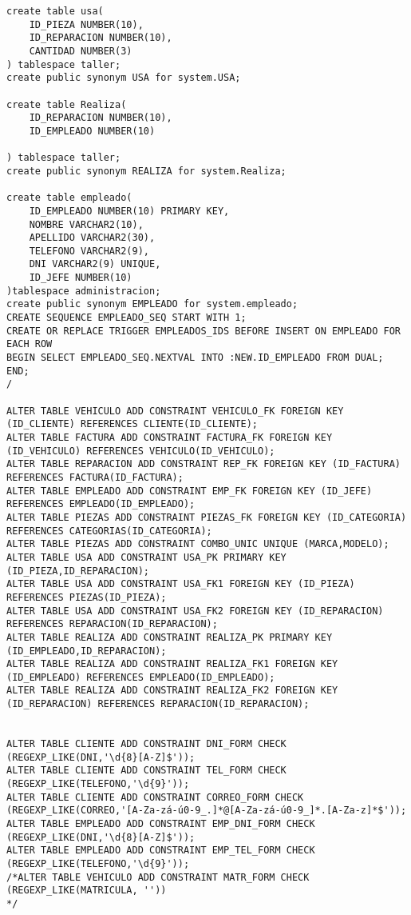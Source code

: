 \begin{lstlisting}[caption=Script .sql para crear la BD.]
create table usa(
    ID_PIEZA NUMBER(10),
    ID_REPARACION NUMBER(10),
    CANTIDAD NUMBER(3)
) tablespace taller;
create public synonym USA for system.USA;

create table Realiza(
    ID_REPARACION NUMBER(10),
    ID_EMPLEADO NUMBER(10)

) tablespace taller;
create public synonym REALIZA for system.Realiza;

create table empleado(
    ID_EMPLEADO NUMBER(10) PRIMARY KEY,
    NOMBRE VARCHAR2(10),
    APELLIDO VARCHAR2(30),
    TELEFONO VARCHAR2(9),
    DNI VARCHAR2(9) UNIQUE,
    ID_JEFE NUMBER(10)
)tablespace administracion;
create public synonym EMPLEADO for system.empleado;
CREATE SEQUENCE EMPLEADO_SEQ START WITH 1;
CREATE OR REPLACE TRIGGER EMPLEADOS_IDS BEFORE INSERT ON EMPLEADO FOR EACH ROW
BEGIN SELECT EMPLEADO_SEQ.NEXTVAL INTO :NEW.ID_EMPLEADO FROM DUAL;
END;
/

ALTER TABLE VEHICULO ADD CONSTRAINT VEHICULO_FK FOREIGN KEY (ID_CLIENTE) REFERENCES CLIENTE(ID_CLIENTE);
ALTER TABLE FACTURA ADD CONSTRAINT FACTURA_FK FOREIGN KEY (ID_VEHICULO) REFERENCES VEHICULO(ID_VEHICULO);
ALTER TABLE REPARACION ADD CONSTRAINT REP_FK FOREIGN KEY (ID_FACTURA) REFERENCES FACTURA(ID_FACTURA);
ALTER TABLE EMPLEADO ADD CONSTRAINT EMP_FK FOREIGN KEY (ID_JEFE) REFERENCES EMPLEADO(ID_EMPLEADO);
ALTER TABLE PIEZAS ADD CONSTRAINT PIEZAS_FK FOREIGN KEY (ID_CATEGORIA) REFERENCES CATEGORIAS(ID_CATEGORIA);
ALTER TABLE PIEZAS ADD CONSTRAINT COMBO_UNIC UNIQUE (MARCA,MODELO);
ALTER TABLE USA ADD CONSTRAINT USA_PK PRIMARY KEY (ID_PIEZA,ID_REPARACION);
ALTER TABLE USA ADD CONSTRAINT USA_FK1 FOREIGN KEY (ID_PIEZA) REFERENCES PIEZAS(ID_PIEZA);
ALTER TABLE USA ADD CONSTRAINT USA_FK2 FOREIGN KEY (ID_REPARACION) REFERENCES REPARACION(ID_REPARACION);
ALTER TABLE REALIZA ADD CONSTRAINT REALIZA_PK PRIMARY KEY (ID_EMPLEADO,ID_REPARACION);
ALTER TABLE REALIZA ADD CONSTRAINT REALIZA_FK1 FOREIGN KEY (ID_EMPLEADO) REFERENCES EMPLEADO(ID_EMPLEADO);
ALTER TABLE REALIZA ADD CONSTRAINT REALIZA_FK2 FOREIGN KEY (ID_REPARACION) REFERENCES REPARACION(ID_REPARACION);


ALTER TABLE CLIENTE ADD CONSTRAINT DNI_FORM CHECK (REGEXP_LIKE(DNI,'\d{8}[A-Z]$'));
ALTER TABLE CLIENTE ADD CONSTRAINT TEL_FORM CHECK (REGEXP_LIKE(TELEFONO,'\d{9}'));
ALTER TABLE CLIENTE ADD CONSTRAINT CORREO_FORM CHECK (REGEXP_LIKE(CORREO,'[A-Za-zá-ú0-9_.]*@[A-Za-zá-ú0-9_]*.[A-Za-z]*$'));
ALTER TABLE EMPLEADO ADD CONSTRAINT EMP_DNI_FORM CHECK (REGEXP_LIKE(DNI,'\d{8}[A-Z]$'));
ALTER TABLE EMPLEADO ADD CONSTRAINT EMP_TEL_FORM CHECK (REGEXP_LIKE(TELEFONO,'\d{9}'));
/*ALTER TABLE VEHICULO ADD CONSTRAINT MATR_FORM CHECK (REGEXP_LIKE(MATRICULA, ''))
*/



\end{lstlisting}
